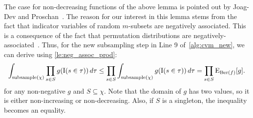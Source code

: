 The case for non-decreasing functions of the above lemma is pointed out by Joag-Dev and Proschan~\cite[P.2]{joagdev1983}.
The reason for our interest in this lemma stems from the fact that indicator variables of random $m$-subsets are negatively associated.
This is a consequence of the fact that permutation distributions are negatively-associated~\cite[Th. 2.11]{joagdev1983}.%
Thus, for the new subsampling step in Line 9 of~\cref{alg:cvm_new}, we can derive using \cref{le:neg_assoc_prod}:
\begin{equation}\label{eq:subsample_with_n_subsets}
  \int_{\mathrm{subsample}(\chi)} \prod_{s \in S} g(\operatorname{\mathrm{I}}(s \in \tau))\,d\tau \leq
  \prod_{s \in S} \int_{\mathrm{subsample}(\chi)} g(\operatorname{\mathrm{I}}(s \in \tau))\,d\tau = \prod_{s \in S}  \operatorname{\mathrm{E}}_{\operatorname{\mathrm{Ber}}(f)}[g] \textrm{.}
\end{equation}
for any non-negative $g$ and $S \subseteq \chi$.
Note that the domain of $g$ has two values, so it is either non-increasing or non-decreasing.
Also, if $S$ is a singleton, the inequality becomes an equality.


